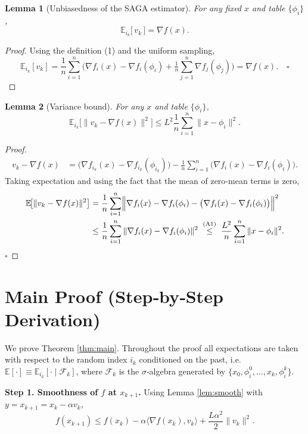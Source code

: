 \documentclass{article}
\newtheorem{lemma}{Lemma}
\newcommand{\E}{\mathbb{E}}
\begin{document}
\begin{lemma}[Unbiasedness of the SAGA estimator]\label{lem:unbiased}
For any fixed $x$ and table $\{\phi_i\}$,
\[
\E_{i_k}\bigl[\,v_k\,\bigr]=\nabla f(x).
\tag{L2}
\]
\end{lemma}
\begin{proof}
Using the definition (1) and the uniform sampling,
\[
\E_{i_k}[v_k]=\frac1n\sum_{i=1}^{n}
\bigl(\nabla f_i(x)-\nabla f_i(\phi_i)+\tfrac1n\sum_{j=1}^{n}\nabla f_j(\phi_j)\bigr)
= \nabla f(x). \quad\square
\]
\end{proof}

\begin{lemma}[Variance bound]\label{lem:var}
For any $x$ and table $\{\phi_i\}$,
\[
\E_{i_k}\!\bigl[\|v_k-\nabla f(x)\|^{2}\bigr]
\le L^{2}\frac{1}{n}\sum_{i=1}^{n}\|x-\phi_i\|^{2}.
\tag{L3}
\]
\end{lemma}
\begin{proof}
\[
\begin{aligned}
v_k-\nabla f(x) 
&= \bigl(\nabla f_{i_k}(x)-\nabla f_{i_k}(\phi_{i_k})\bigr)
   -\frac1n\sum_{i=1}^{n}\bigl(\nabla f_i(x)-\nabla f_i(\phi_i)\bigr).
\end{aligned}
\]
Taking expectation and using the fact that the mean of zero‑mean terms is zero,
\[
\begin{aligned}
\E\!\bigl[\|v_k-\nabla f(x)\|^{2}\bigr]
&= \frac1n\sum_{i=1}^{n}\Bigl\|\nabla f_i(x)-\nabla f_i(\phi_i)
      -\bigl(\nabla f_i(x)-\nabla f_i(\phi_i)\bigr)\Bigr\|^{2}   \\
&\le \frac1n\sum_{i=1}^{n}\|\nabla f_i(x)-\nabla f_i(\phi_i)\|^{2}
   \;\overset{\text{(A1)}}{\le}\;
   \frac{L^{2}}{n}\sum_{i=1}^{n}\|x-\phi_i\|^{2}.
\end{aligned}
\]
$\square$
\end{proof}

\section*{Main Proof (Step‑by‑Step Derivation)}
We prove Theorem \ref{thm:main}.  Throughout the proof all expectations are taken
with respect to the random index $i_k$ conditioned on the past, i.e.
$\E[\cdot]\equiv\E_{i_k}[\cdot\mid\mathcal{F}_k]$, where $\mathcal{F}_k$ is the $\sigma$‑algebra generated by $\{x_0,\phi_i^0,\dots,x_k,\phi_i^k\}$.

\noindent\textbf{Step 1. Smoothness of $f$ at $x_{k+1}$.}  
Using Lemma \ref{lem:smooth} with $y=x_{k+1}=x_k-\alpha v_k$,
\[
f(x_{k+1})\le f(x_k)-\alpha\langle\nabla f(x_k),v_k\rangle
                +\frac{L\alpha^{2}}{2}\|v_k\|^{2}.
\tag{S1}
\]
\end{document}
